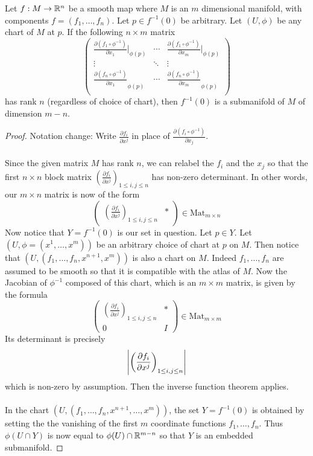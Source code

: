 \documentclass[a4paper]{article}
\begin{document}
\begin{prp}{}{} Let $f:M\to \mathbb{R}^n$ be a smooth map where $M$ is an $m$ dimensional manifold, with components $f=(f_1,\dots,f_n)$. Let $p\in f^{-1}(0)$ be arbitrary. Let $(U,\phi)$ be any chart of $M$ at $p$. If the following $n\times m$ matrix $$\begin{pmatrix}
\frac{\partial(f_1\circ\phi^{-1})}{\partial x_1}|_{\phi(p)} & \cdots & \frac{\partial(f_1\circ\phi^{-1})}{\partial x_m}|_{\phi(p)}\\
\vdots & \ddots & \vdots\\
\frac{\partial(f_n\circ\phi^{-1})}{\partial x_1}_{\phi(p)} & \cdots & \frac{\partial(f_n\circ\phi^{-1})}{\partial x_m}_{\phi(p)}\\
\end{pmatrix}$$
has rank $n$ (regardless of choice of chart), then $f^{-1}(0)$ is a submanifold of $M$ of dimension $m-n$. \tcbline
\begin{proof}
Notation change: Write $\frac{\partial f_i}{\partial x^j}$ in place of $\frac{\partial(f_i\circ\phi^{-1})}{\partial x_j}$. \\~\\
 
Since the given matrix $M$ has rank $n$, we can relabel the $f_i$ and the $x_j$ so that the first $n\times n$ block matrix $\left(\frac{\partial f_i}{\partial x^j}\right)_{1\leq i,j\leq n}$ has non-zero determinant. In other words, our $m\times n$ matrix is now of the form $$\begin{pmatrix}
\left(\frac{\partial f_i}{\partial x^j}\right)_{1\leq i,j\leq n} & \ast
\end{pmatrix}\in\text{Mat}_{m\times n}$$ Now notice that $Y=f^{-1}(0)$ is our set in question. Let $p\in Y$. Let $(U,\phi=(x^1,\dots,x^m))$ be an arbitrary choice of chart at $p$ on $M$. Then notice that $(U,(f_1,\dots,f_n,x^{n+1},x^m))$ is also a chart on $M$. Indeed $f_1,\dots,f_n$ are assumed to be smooth so that it is compatible with the atlas of $M$. Now the Jacobian of $\phi^{-1}$ composed of this chart, which is an $m\times m$ matrix, is given by the formula $$\begin{pmatrix}
\left(\frac{\partial f_i}{\partial x^j}\right)_{1\leq i,j\leq n} & \ast\\
0 & I
\end{pmatrix}\in\text{Mat}_{m\times m}$$ Its determinant is precisely $$\abs{\left(\frac{\partial f_i}{\partial x^j}\right)_{1\leq i,j\leq n}}$$ which is non-zero by assumption. Then the inverse function theorem applies. \\~\\

In the chart $(U,(f_1,\dots,f_n,x^{n+1},\dots,x^m))$, the set $Y=f^{-1}(0)$ is obtained by setting the the vanishing of the first $m$ coordinate functions $f_1,\dots,f_n$. Thus $\phi(U\cap Y)$ is now equal to $\phi(U)\cap\mathbb{R}^{m-n}$ so that $Y$ is an embedded submanifold. 
\end{proof}
\end{prp}
\end{document}
